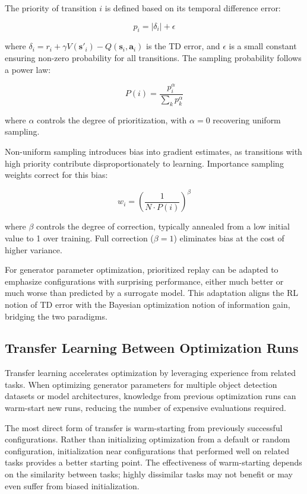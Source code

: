 The priority of transition $i$ is defined based on its temporal difference error:

\begin{equation}
p_i = |\delta_i| + \epsilon
\end{equation}

where $\delta_i = r_i + \gamma V(\mathbf{s}'_i) - Q(\mathbf{s}_i, \mathbf{a}_i)$ is the TD error, and $\epsilon$ is a small constant ensuring non-zero probability for all transitions. The sampling probability follows a power law:

\begin{equation}
P(i) = \frac{p_i^\alpha}{\sum_k p_k^\alpha}
\end{equation}

where $\alpha$ controls the degree of prioritization, with $\alpha = 0$ recovering uniform sampling.

Non-uniform sampling introduces bias into gradient estimates, as transitions with high priority contribute disproportionately to learning. Importance sampling weights correct for this bias:

\begin{equation}
w_i = \left( \frac{1}{N \cdot P(i)} \right)^\beta
\end{equation}

where $\beta$ controls the degree of correction, typically annealed from a low initial value to 1 over training. Full correction ($\beta = 1$) eliminates bias at the cost of higher variance.

For generator parameter optimization, prioritized replay can be adapted to emphasize configurations with surprising performance, either much better or much worse than predicted by a surrogate model. This adaptation aligns the RL notion of TD error with the Bayesian optimization notion of information gain, bridging the two paradigms.

\subsection{Transfer Learning Between Optimization Runs}
\label{subsec:transfer_learning}

Transfer learning accelerates optimization by leveraging experience from related tasks. When optimizing generator parameters for multiple object detection datasets or model architectures, knowledge from previous optimization runs can warm-start new runs, reducing the number of expensive evaluations required.

The most direct form of transfer is warm-starting from previously successful configurations. Rather than initializing optimization from a default or random configuration, initialization near configurations that performed well on related tasks provides a better starting point. The effectiveness of warm-starting depends on the similarity between tasks; highly dissimilar tasks may not benefit or may even suffer from biased initialization.

